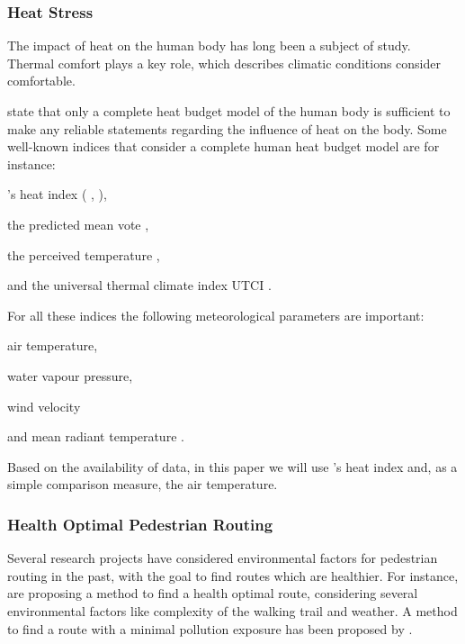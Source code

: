 \subsubsection{Heat Stress}
The impact of heat on the human body has long been a subject of study. Thermal comfort plays a key role, which describes climatic conditions consider comfortable. 

\textcite{Staiger1997} state that only a complete heat budget model of the human body is sufficient to make any reliable statements regarding the influence of heat on the body. Some well-known indices that consider a complete human heat budget model are for instance:
\begin{inparaenum}[(1)]
  \item \citeauthor{Steadman1979}'s heat index (\citeauthor{Steadman1979} \citeyear*{Steadman1979}, \citeyear*{Steadman1979a}),
  \item the predicted mean vote \parencite[PMV,][]{Fanger1973},
  \item the perceived temperature \parencite{Staiger1997,Jendritzky2000},
  \item and the universal thermal climate index UTCI \parencite{Jendritzky2010}.
\end{inparaenum}

For all these indices the following meteorological parameters are important:
\begin{inparaenum}[(1)]
\item air temperature,
\item water vapour pressure,
\item wind velocity 
\item and mean radiant temperature \parencite{Jendritzky2010}.
\end{inparaenum}

Based on the availability of data, in this paper we will use \citeauthor{Steadman1979}'s heat index \parencite{Steadman1979} and, as a simple comparison measure, the air temperature.

\subsubsection{Health Optimal Pedestrian Routing}
Several research projects have considered environmental factors for pedestrian routing in the past, with the goal to find routes which are healthier. For instance, \textcite{Sharker2012} are proposing a method to find a health optimal route, considering several environmental factors like complexity of the walking trail and weather. A method to find a route with a minimal pollution exposure has been proposed by \textcite{Hasenfratz2015}.

